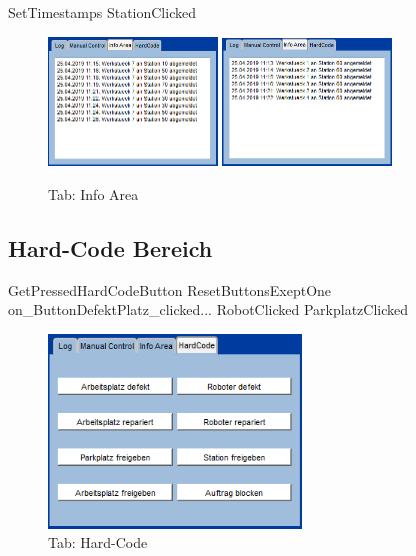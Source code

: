 SetTimestamps
StationClicked
\begin{figure}[htb]
    \centering
    \includegraphics[width=0.4\textwidth]{Abbildungen/TimestampsWerkstueck.png}
    \includegraphics[width=0.4\textwidth]{Abbildungen/TimestampsStation.png}
    \caption{Tab: Info Area}		
    \label{fig:InfoArea}
\end{figure}

\subsection{Hard-Code Bereich}
\label{sec:HardCode}
GetPressedHardCodeButton
ResetButtonsExeptOne
on_ButtonDefektPlatz_clicked...
RobotClicked
ParkplatzClicked
\begin{figure}[htb]
    \centering
    \includegraphics[width=0.6\textwidth]{Abbildungen/HardCode.png}
    \caption{Tab: Hard-Code}		
    \label{fig:HardCode}
\end{figure}

